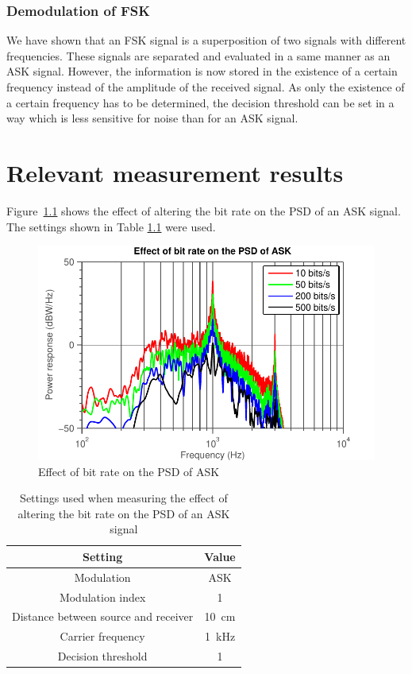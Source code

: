 \documentclass[11pt,titlepage]{report}
\begin{document}
\begin{appendices}
\subsection{Demodulation of FSK}
We have shown that an FSK signal is a superposition of two signals with different frequencies. These signals are separated and evaluated in a same manner as an ASK signal. However, the information is now stored in the existence of a certain frequency instead of the amplitude of the received signal. As only the existence of a certain frequency has to be determined, the decision threshold can be set in a way which is less sensitive for noise than for an ASK signal.

\chapter{Relevant measurement results}
\label{app:res}
Figure~\ref{fig:app-ask-br} shows the effect of altering the bit rate on the PSD of an ASK signal. The settings shown in Table \ref{tab:app-ask-br-settings} were used.

\begin{figure}[H]
	\begin{center}
		\includegraphics[width=0.8\linewidth]{resource/ask-br.pdf}
	\end{center}
	\caption{Effect of bit rate on the PSD of ASK}
	\label{fig:app-ask-br}
\end{figure}

\begin{table}[H]
	\centering
	\caption{Settings used when measuring the effect of altering the bit rate on the PSD of an ASK signal}
	\label{tab:app-ask-br-settings}
	\begin{tabular}{c c}
		\hline\hline
		Setting & Value \\
		\hline
		Modulation & ASK \\
		Modulation index & \num{1} \\
		Distance between source and receiver & \SI{10}{cm} \\
		Carrier frequency & \SI{1}{kHz} \\
		Decision threshold & \num{1} \\
		\hline
	\end{tabular}
\end{table}


\end{appendices}
\end{document}
